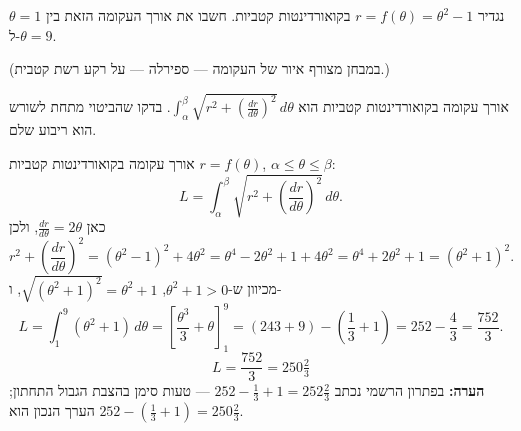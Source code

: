 
\begin{question}
נגדיר $r=f(\theta)=\theta^2-1$ בקואורדינטות קטביות. חשבו את אורך העקומה הזאת בין $\theta=1$ ל-$\theta=9$.

(במבחן מצורף איור של העקומה — ספירלה — על רקע רשת קטבית.)
\end{question}

\begin{hint}
אורך עקומה בקואורדינטות קטביות הוא $\int_\alpha^\beta\sqrt{r^2+\left(\frac{dr}{d\theta}\right)^2}\,d\theta$. בדקו שהביטוי מתחת לשורש הוא ריבוע שלם.
\end{hint}

\begin{solution}
אורך עקומה בקואורדינטות קטביות $r=f(\theta)$, $\alpha\le\theta\le\beta$:
\[ L=\int_\alpha^\beta\sqrt{r^2+\left(\frac{dr}{d\theta}\right)^2}\,d\theta. \]
כאן $\frac{dr}{d\theta}=2\theta$, ולכן
\[ r^2+\left(\frac{dr}{d\theta}\right)^2=(\theta^2-1)^2+4\theta^2=\theta^4-2\theta^2+1+4\theta^2=\theta^4+2\theta^2+1=(\theta^2+1)^2. \]
מכיוון ש-$\theta^2+1>0$, $\sqrt{(\theta^2+1)^2}=\theta^2+1$, ו-
\[ L=\int_1^9(\theta^2+1)\,d\theta=\left[\frac{\theta^3}{3}+\theta\right]_1^9=\left(243+9\right)-\left(\frac13+1\right)=252-\frac43=\frac{752}{3}. \]
\[ \boxed{L=\frac{752}{3}=250\tfrac23} \]
\textbf{הערה:} בפתרון הרשמי נכתב $252-\frac13+1=252\frac23$ — טעות סימן בהצבת הגבול התחתון; הערך הנכון הוא $252-\left(\frac13+1\right)=250\frac23$.
\end{solution}
